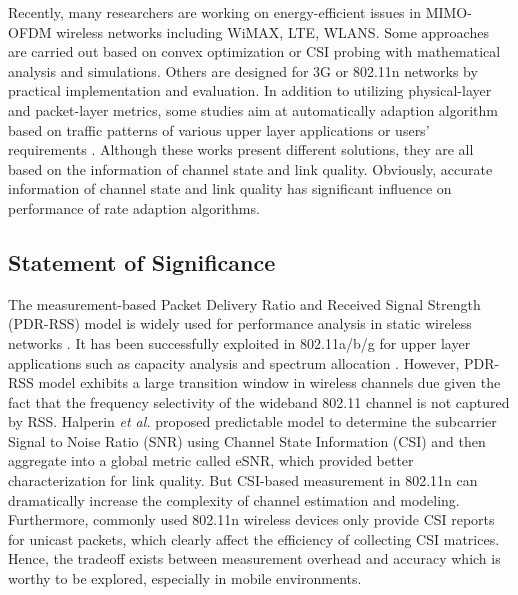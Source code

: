 \documentclass[draftclsnofoot,journal,onecolumn,11pt]{IEEEtran}
\begin{document}
Recently, many researchers are working on energy-efficient issues in MIMO-OFDM wireless networks including WiMAX, LTE, WLANS. Some approaches are carried out based on convex optimization \cite{5510775} or CSI probing \cite{6214414} with mathematical analysis and simulations. Others are designed for 3G \cite{Peng:2011:TPS:2030613.2030628} or 802.11n \cite{Li:2012:ERA:2348543.2348585} \cite{Zhang:2011:EEI:2030613.2030637} networks by practical implementation and evaluation. In addition to utilizing physical-layer and packet-layer metrics, some studies aim at automatically adaption algorithm based on traffic patterns of various upper layer applications \cite{Han:2012:DPW:2307636.2307675} \cite{Jang:2011:SEM:2079296.2079308} or users' requirements \cite{Zhuang:2010:IEE:1814433.1814464} \cite{Schulman:2010:BPA:1859995.1860006}. Although these works present different solutions, they are all based on the information of channel state and link quality. Obviously, accurate information of channel state and link quality has significant influence on performance of rate adaption algorithms.

\subsection{Statement of Significance}

The measurement-based Packet Delivery Ratio and Received Signal Strength (PDR-RSS) model is widely used for performance analysis in static wireless networks \cite{reis2006model}. It has been successfully exploited in 802.11a/b/g for upper layer applications such as capacity analysis \cite{kashyap2007capacity} and spectrum allocation \cite{k.rayanchu:fluid:}. However, PDR-RSS model exhibits a large transition window in wireless channels due given the fact that the frequency selectivity of the wideband 802.11 channel is not captured by RSS. Halperin \textit{et al.} \cite{Halperin2010predictable} proposed predictable model to determine the subcarrier Signal to Noise Ratio (SNR) using Channel State Information (CSI) and then aggregate into a global metric called eSNR, which provided better characterization for link quality. But CSI-based measurement in 802.11n can dramatically increase the complexity of channel estimation and modeling. Furthermore, commonly used 802.11n wireless devices only provide CSI reports for unicast packets, which clearly affect the efficiency of collecting CSI matrices. Hence, the tradeoff exists between measurement overhead and accuracy which is worthy to be explored, especially in mobile environments.
\end{document}
